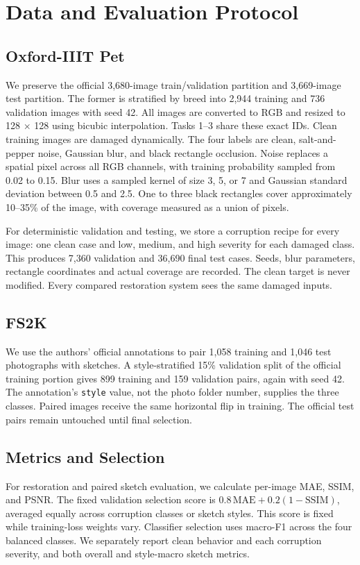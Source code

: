 \documentclass[conference]{IEEEtran}
\begin{document}
\section{Data and Evaluation Protocol}
\subsection{Oxford-IIIT Pet}
We preserve the official 3,680-image train/validation partition and 3,669-image test partition. The former is stratified by breed into 2,944 training and 736 validation images with seed 42. All images are converted to RGB and resized to 128 $\times$ 128 using bicubic interpolation. Tasks 1--3 share these exact IDs. Clean training images are damaged dynamically. The four labels are clean, salt-and-pepper noise, Gaussian blur, and black rectangle occlusion. Noise replaces a spatial pixel across all RGB channels, with training probability sampled from 0.02 to 0.15. Blur uses a sampled kernel of size 3, 5, or 7 and Gaussian standard deviation between 0.5 and 2.5. One to three black rectangles cover approximately 10--35\% of the image, with coverage measured as a union of pixels.

For deterministic validation and testing, we store a corruption recipe for every image: one clean case and low, medium, and high severity for each damaged class. This produces 7,360 validation and 36,690 final test cases. Seeds, blur parameters, rectangle coordinates and actual coverage are recorded. The clean target is never modified. Every compared restoration system sees the same damaged inputs.

\subsection{FS2K}
We use the authors' official annotations to pair 1,058 training and 1,046 test photographs with sketches. A style-stratified 15\% validation split of the official training portion gives 899 training and 159 validation pairs, again with seed 42. The annotation's \texttt{style} value, not the photo folder number, supplies the three classes. Paired images receive the same horizontal flip in training. The official test pairs remain untouched until final selection.

\subsection{Metrics and Selection}
For restoration and paired sketch evaluation, we calculate per-image MAE, SSIM, and PSNR. The fixed validation selection score is $0.8\,\mathrm{MAE}+0.2(1-\mathrm{SSIM})$, averaged equally across corruption classes or sketch styles. This score is fixed while training-loss weights vary. Classifier selection uses macro-F1 across the four balanced classes. We separately report clean behavior and each corruption severity, and both overall and style-macro sketch metrics.
\end{document}
